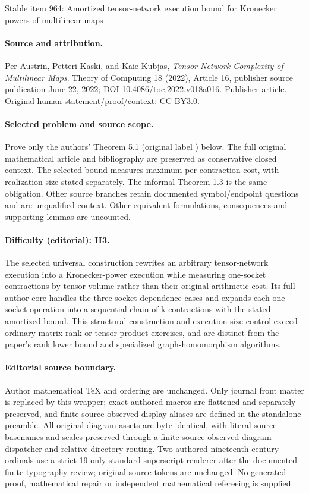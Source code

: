\documentclass[11pt]{article}
\numberwithin{equation}{section}
\theoremstyle{definition}
\theoremstyle{plain}
\begin{document}
\begin{center}{\Large Stable item 964: Amortized tensor-network execution bound for Kronecker powers of multilinear maps}\end{center}
\paragraph{Source and attribution.}
Per Austrin, Petteri Kaski, and Kaie Kubjas, \emph{Tensor Network Complexity of Multilinear Maps}. Theory of Computing 18 (2022), Article 16, publisher source publication June 22, 2022; DOI 10.4086/toc.2022.v018a016. \href{https://theoryofcomputing.org/articles/v018a016/}{Publisher article}. Original human statement/proof/context: \href{https://creativecommons.org/licenses/by/3.0/}{CC BY3.0}.
\paragraph{Selected problem and source scope.}
Prove only the authors' Theorem 5.1 (original label ) below. The full original mathematical article and bibliography are preserved as conservative closed context. The selected bound measures maximum per-contraction cost, with realization size stated separately. The informal Theorem 1.3 is the same obligation. Other source branches retain documented symbol/endpoint questions and are unqualified context. Other equivalent formulations, consequences and supporting lemmas are uncounted.
\paragraph{Difficulty (editorial): H3.}
The selected universal construction rewrites an arbitrary tensor-network execution into a Kronecker-power execution while measuring one-socket contractions by tensor volume rather than their original arithmetic cost. Its full author core handles the three socket-dependence cases and expands each one-socket operation into a sequential chain of k contractions with the stated amortized bound. This structural construction and execution-size control exceed ordinary matrix-rank or tensor-product exercises, and are distinct from the paper’s rank lower bound and specialized graph-homomorphism algorithms.
\paragraph{Editorial source boundary.}
Author mathematical TeX and ordering are unchanged. Only journal front matter is replaced by this wrapper; exact authored macros are flattened and separately preserved, and finite source-observed display aliases are defined in the standalone preamble. All original diagram assets are byte-identical, with literal source basenames and scales preserved through a finite source-observed diagram dispatcher and relative directory routing. Two authored nineteenth-century ordinals use a strict 19-only standard superscript renderer after the documented finite typography review; original source tokens are unchanged. No generated proof, mathematical repair or independent mathematical refereeing is supplied. 
\clearpage
\end{document}
